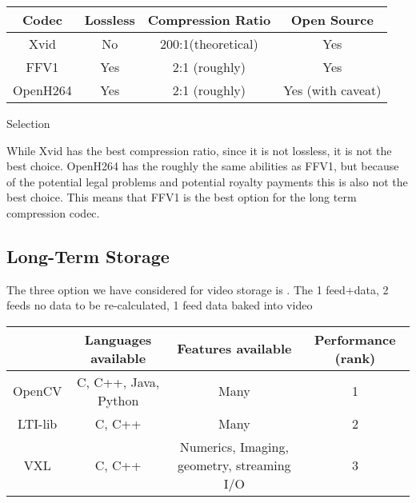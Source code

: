 \documentclass[letterpaper,10pt,onecolumn,draftclsnofoot]{IEEEtran}
\begin{document}
\begin{center}
	\begin{tabular}{|c|c|c|c|}
		\hline
		\textbf{Codec} & \textbf{Lossless} & \textbf{Compression Ratio} & \textbf{Open Source} \\
		\hline
		Xvid & No & 200:1(theoretical) & Yes \\
		\hline
		FFV1 & Yes & 2:1 (roughly) & Yes \\
		\hline
		OpenH264 & Yes & 2:1 (roughly) & Yes (with caveat) \\
		\hline
		
	\end{tabular}
\end{center}

Selection

While Xvid has the best compression ratio, since it is not lossless, it is not the best choice.
OpenH264 has the roughly the same abilities as FFV1, but because of the potential legal problems and potential royalty payments this is also not the best choice.
This means that FFV1 is the best option for the long term compression codec.

\newpage
\subsection{Long-Term Storage} %

The three option we have considered for video storage is .
The 
1 feed+data, 
2 feeds no data to be re-calculated, 
1 feed data baked into video

\begin{center}
	\begin{tabular}{|c|c|c|c|}
		
		\hline
		\textbf{} & \textbf{Languages available} & \textbf{Features available} & \textbf{Performance (rank)} \\
		\hline
		OpenCV & C, C++, Java, Python & Many & 1 \\
		\hline
		LTI-lib & C, C++ & Many & 2 \\
		\hline
		VXL & C, C++ & Numerics, Imaging, geometry, streaming I/O & 3 \\
		\hline
		
	\end{tabular}
\end{center}

\newpage
\end{document}
